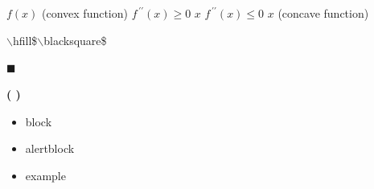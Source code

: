 \documentclass{article}
\begin{document}
%	 

\section{ }


\linespread{1}  %
\begin{frame}{\textbf{ }}
\linespread{1.5} %

	\begin{block}{\textbf{ }} 
		 $f\left(x\right)$ (convex function) 
		 $f^{\,\prime\prime}\!\left(x\right)\ge0$ $x$ 
		 $f^{\,\prime\prime}\!\left(x\right)\le0$ $x$ 
		 (concave function) 
	\end{block}
	
	\begin{block}{\textbf{ }} 
		 
		 $\backslash$hfill\$$\backslash$blacksquare\$ 
         
		\hfill$\blacksquare$
	\end{block}
	
\end{frame}


\linespread{1}  %
\begin{frame}{\textbf{  ( )}}
\linespread{1.5} %

	\begin{alertblock}{\textbf{ }}
		 
		 
	\end{alertblock}
	
	\begin{example}
		 
		\begin{itemize}
			\item block  
			\item alertblock  
			\item example  
		\end{itemize}
	\end{example}
	
\end{frame}

\end{document}
